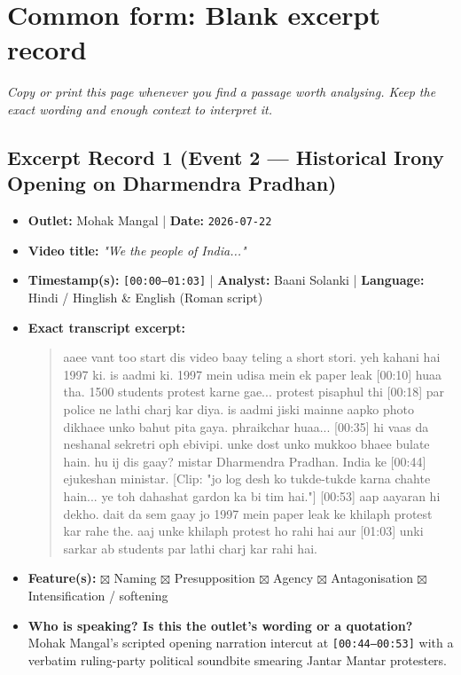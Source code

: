 \documentclass[10pt,a4paper]{article}
\begin{document}
\section*{Common form: Blank excerpt record}
\textit{Copy or print this page whenever you find a passage worth analysing. Keep the exact wording and enough context to interpret it.}


\subsection*{Excerpt Record 1 (Event 2 --- Historical Irony Opening on Dharmendra Pradhan)}
\begin{itemize}[leftmargin=1.5em, itemsep=3pt, topsep=4pt]
  \item \textbf{Outlet:} Mohak Mangal | \textbf{Date:} \texttt{2026-07-22}
  \item \textbf{Video title:} \textit{"We the people of India..."}
  \item \textbf{Timestamp(s):} \texttt{[00:00--01:03]} | \textbf{Analyst:} Baani Solanki | \textbf{Language:} Hindi / Hinglish \& English (Roman script)
  \item \textbf{Exact transcript excerpt:}
    \begin{quote}\small\ttfamily [00:00] aaee vant too start dis video baay teling a short stori. yeh kahani hai 1997 ki. is aadmi ki. 1997 mein udisa mein ek paper leak [00:10] huaa tha. 1500 students protest karne gae... protest pisaphul thi [00:18] par police ne lathi charj kar diya. is aadmi jiski mainne aapko photo dikhaee unko bahut pita gaya. phraikchar huaa... [00:35] hi vaas da neshanal sekretri oph ebivipi. unke dost unko mukkoo bhaee bulate hain. hu ij dis gaay? mistar Dharmendra Pradhan. India ke [00:44] ejukeshan ministar. [Clip: "jo log desh ko tukde-tukde karna chahte hain... ye toh dahashat gardon ka bi tim hai."] [00:53] aap aayaran hi dekho. dait da sem gaay jo 1997 mein paper leak ke khilaph protest kar rahe the. aaj unke khilaph protest ho rahi hai aur [01:03] unki sarkar ab students par lathi charj kar rahi hai.\end{quote}
  \item \textbf{Feature(s):} $\boxtimes$ Naming $\boxtimes$ Presupposition $\boxtimes$ Agency $\boxtimes$ Antagonisation $\boxtimes$ Intensification / softening
  \item \textbf{Who is speaking? Is this the outlet's wording or a quotation?} Mohak Mangal's scripted opening narration intercut at \texttt{[00:44--00:53]} with a verbatim ruling-party political soundbite smearing Jantar Mantar protesters.

\end{itemize}
\end{document}
